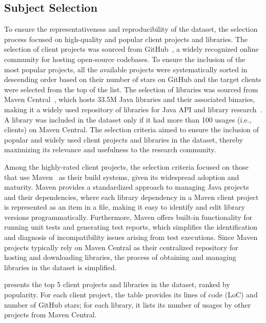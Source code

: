 \subsection{Subject Selection}
To ensure the representativeness and reproducibility of the \toolcompsuite dataset, the selection process focused on high-quality and popular client projects and
libraries. The selection of client projects was sourced from
GitHub~\cite{github}, a widely recognized online community for hosting
open-source codebases. To ensure the inclusion of the most
popular projects, all the available projects were systematically sorted
in descending order based on their number of stars on GitHub and the target clients were selected from the top of the list. The selection of
libraries was sourced from Maven Central~\cite{mvnrepo}, which hosts
33.5M Java libraries and their associated binaries, making it
a widely used repository of libraries for Java API and library
research~\cite{mostafa2017study,wu2016exploratory,qiu2016understanding,kula2014visualizing}. A library was included in the dataset only if it had more than 100 usages (i.e., clients) on Maven
Central. The selection criteria aimed to ensure the inclusion of
popular and widely used client projects and libraries in the dataset,
thereby maximizing its relevance and usefulness to the research
community.

Among the highly-rated client projects, the selection criteria focused
on those that use Maven~\cite{mvn} as their build systems, given its
widespread adoption and maturity. Maven provides a standardized
approach to managing Java projects and their dependencies, where each
library dependency in a Maven client project is represented as an item
in a  file, making it easy to identify and edit library
versions programmatically. Furthermore, Maven offers built-in
functionality for running unit tests and generating test reports,
which simplifies the identification and diagnosis of incompatibility
issues arising from test executions. Since Maven projects typically rely on Maven Central as their
centralized repository for hosting and downloading libraries, the process of obtaining and managing
libraries in the dataset is simplified.

 presents the top 5 client projects and libraries in the \toolcompsuite dataset, ranked by popularity. For
each client project, the table provides its lines of code (LoC) and number of GitHub stars; for each library, it lists its number of usages by other projects from Maven Central.

